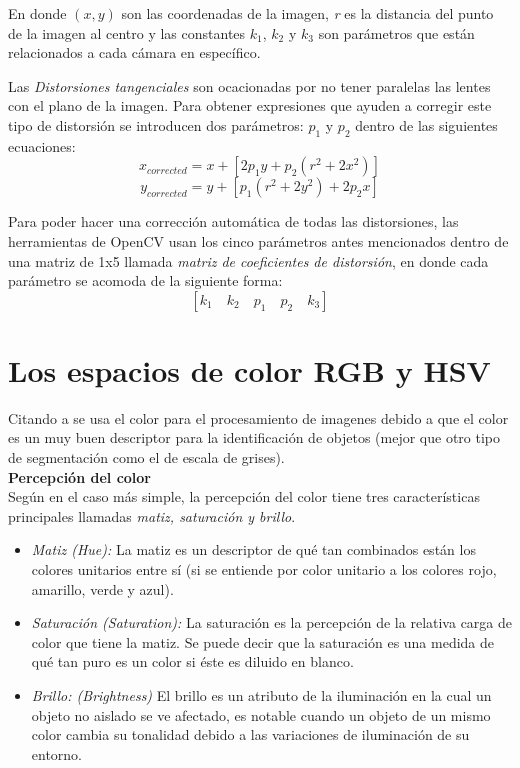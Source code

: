 \documentclass{book}
\begin{document}
En donde $(x,y)$ son las coordenadas de la imagen, \textit{r} es la distancia del punto de la imagen al centro y las constantes $k_1$, $k_2$ y $k_3$ son parámetros que están relacionados a cada cámara en específico.

Las \textit{Distorsiones tangenciales} son ocacionadas por no tener paralelas las lentes con el plano de la imagen. Para obtener expresiones que ayuden a corregir este tipo de distorsión se introducen dos parámetros: $p_{1}$ y $p_{2}$ dentro de las siguientes ecuaciones:
\[x_{corrected} = x + [2p_1y+p_2(r^2+2x^2)]\]
\[y_{corrected} = y + [p_1(r^2+2y^2)+2p_2x]\]

Para poder hacer una corrección automática de todas las distorsiones, las herramientas de OpenCV usan los cinco parámetros antes mencionados dentro de una matriz de 1x5 llamada \textit{matriz de coeficientes de distorsión}, en donde cada parámetro se acomoda de la siguiente forma:
\[[k_1 \quad k_2 \quad p_1 \quad p_2 \quad k_3]\]
\section{Los espacios de color RGB y HSV}
Citando a \cite{gonzalez2002digital} se usa el color para el procesamiento de imagenes debido a que el color es un muy buen descriptor para la identificación de objetos (mejor que otro tipo de segmentación como el de escala de grises).
\\

\textbf{Percepción del color}\\
Según \cite{agoston2005computer} en el caso más simple, la percepción del color tiene tres características principales llamadas \textit{matiz, saturación y brillo}. 
\begin{itemize}
\item \textit{Matiz (Hue):} La matiz es un descriptor de qué tan combinados están los colores unitarios entre sí (si se entiende por color unitario a los colores rojo, amarillo, verde y azul).

\item \textit{Saturación (Saturation): } La saturación es la percepción de la relativa carga de color que tiene la matiz. Se puede decir que la saturación es una medida de qué tan puro es un color si éste es diluido en blanco.

\item \textit{Brillo: (Brightness)} El brillo es un atributo de la iluminación en la cual un objeto no aislado se ve afectado, es notable cuando un objeto de un  mismo color cambia su tonalidad debido a las variaciones de iluminación de su entorno.
\end{itemize}
\end{document}
